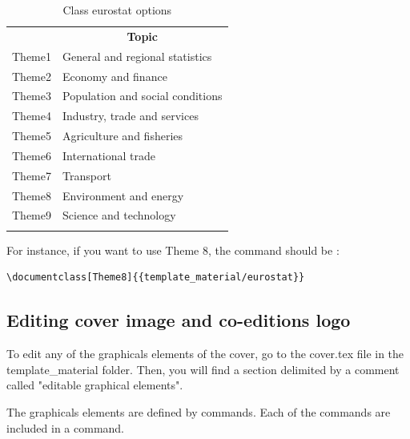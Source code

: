 \documentclass[Theme1]{{template_material/eurostat}}
\begin{document}
\begin{table}[h]
    \caption{Class eurostat options\label{tab_class_options}}
    \begin{tabular}{l|l}
    \hlinesep
    \rowcolor{TH20p}
    \multicolumn{1}{c}{\bf Option} & \multicolumn{1}{c}{\bf Topic}   \\ \hlinesep
    Theme1    & General and regional statistics   \\
    Theme2    & Economy and finance   \\
    Theme3    & Population and social conditions   \\
    Theme4    & Industry, trade and services   \\
    Theme5    & Agriculture and fisheries   \\
    Theme6    & International trade   \\
    Theme7    & Transport   \\
    Theme8    & Environment and energy   \\
    Theme9    & Science and technology   \\ \hlinesep
    \end{tabular}
\end{table}

For instance, if you want to use Theme 8, the   command should be : 

\begin{verbatim}
\documentclass[Theme8]{{template_material/eurostat}}
\end{verbatim}

\subsection{Editing cover image and co-editions logo}

To edit any of the graphicals elements of the cover, go to the cover.tex file in the template\_material folder. Then, you will find a section delimited by a comment called "editable graphical elements". 

The graphicals elements are defined by  commands. Each of the  commands are included in a  command. 
\end{document}
